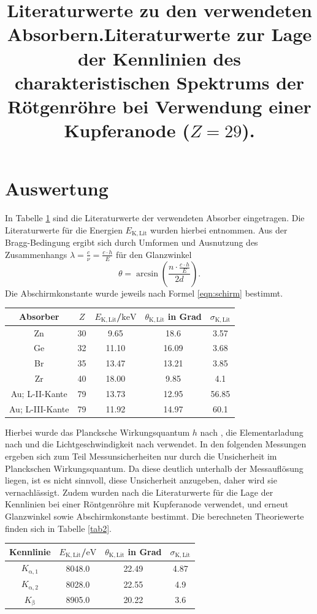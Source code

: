 \section{Auswertung}
\label{sec:Auswertung}
In Tabelle \ref{tab:lit} sind die Literaturwerte der verwendeten Absorber eingetragen.
Die Literaturwerte für die Energien $E_\mathrm{K,Lit}$ wurden hierbei \cite{lit} entnommen.
Aus der Bragg-Bedingung ergibt sich durch Umformen und Ausnutzung des Zusammenhangs $\lambda=\frac{c}{\nu}=\frac{c\cdot h}{E}$ für den Glanzwinkel
\begin{equation}
	\theta=\arcsin{\left(\frac{n\cdot \frac{c\cdot h}{E}}{2d}\right)} \text{.}
\end{equation}
Die Abschirmkonstante wurde jeweils nach Formel \eqref{eqn:schirm} bestimmt.
\begin{table}
	\title{Literaturwerte zu den verwendeten Absorbern.}
	\label{tab:lit}
	\centering
\begin{tabular}{ccccc}
\toprule
Absorber & $Z$ & $E_\mathrm{K,Lit}$/$\si{\kilo\electronvolt}$ & $\theta_\mathrm{K,Lit}$ in Grad&$\sigma_\mathrm{K,Lit}$ \\
\midrule
Zn&30 & 9.65 & 18.6 & 3.57 \\
Ge&32 & 11.10 & 16.09 & 3.68 \\
Br&35 & 13.47& 13.21 & 3.85 \\
Zr&40 & 18.00 & 9.85 & 4.1 \\
Au; L-II-Kante&79 & 13.73 & 12.95 & 56.85 \\
Au; L-III-Kante&79 & 11.92 & 14.97 & 60.1 \\
\bottomrule
\end{tabular}
\end{table}
Hierbei wurde das Plancksche Wirkungsquantum $h$ nach \cite{h}, die Elementarladung nach \cite{e} und die Lichtgeschwindigkeit nach \cite{c} verwendet.
In den folgenden Messungen ergeben sich zum Teil Messunsicherheiten nur durch die Unsicherheit im Planckschen Wirkungsquantum. Da diese deutlich unterhalb der Messauflösung liegen, ist es nicht sinnvoll, diese Unsicherheit anzugeben, daher wird sie vernachlässigt.
Zudem wurden nach \cite{UniG} die Literaturwerte für die Lage der Kennlinien bei einer Röntgenröhre mit Kupferanode verwendet, und erneut Glanzwinkel sowie Abschirmkonstante bestimmt. Die berechneten Theoriewerte finden sich in Tabelle \ref{tab2}.
\begin{table}
	\title{Literaturwerte zur Lage der Kennlinien des charakteristischen Spektrums der Rötgenröhre bei Verwendung einer Kupferanode ($Z=29$).}
	\centering
\begin{tabular}{cccc}
\toprule
 Kennlinie& $E_\mathrm{K,Lit}$/$\si{\electronvolt}$ & $\theta_\mathrm{K,Lit}$ in Grad&$\sigma_\mathrm{K,Lit}$ \\
\midrule
$K_\mathrm{\alpha,1}$& 8048.0 & 22.49 & 4.87 \\
$K_\mathrm{\alpha,2}$& 8028.0 & 22.55 & 4.9 \\
$K_\mathrm{\beta}$& 8905.0 & 20.22 & 3.6 \\
\bottomrule
\end{tabular}
\end{table}


